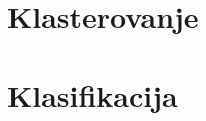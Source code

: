\documentclass[a4paper]{article}
\begin{document}
\section{Klasterovanje}

\section{Klasifikacija}

%
\end{document}
